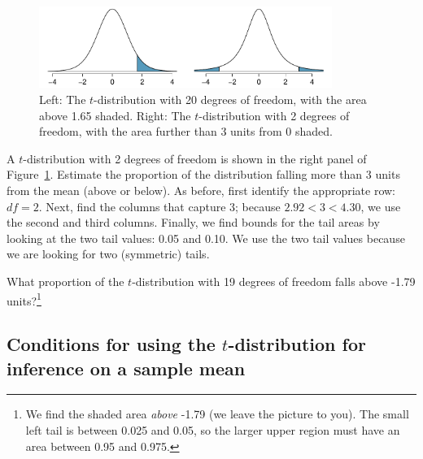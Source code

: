 \begin{figure}
\centering
\includegraphics[width=0.85\textwidth]{ch_inference_foundations_oi_biostat/figures/tDistDF20RightTail1Point65/tDistDF20RightTail1Point65}
\caption{Left: The $t$-distribution with 20 degrees of freedom, with the area above 1.65 shaded. Right: The $t$-distribution with 2 degrees of freedom, with the area further than 3 units from 0 shaded.}
\label{tDistDF20RightTail1Point65}
\end{figure}

\begin{example}{A $t$-distribution with 2 degrees of freedom is shown in the right panel of Figure~\ref{tDistDF20RightTail1Point65}. Estimate the proportion of the distribution falling more than 3 units from the mean (above or below).}
As before, first identify the appropriate row: $df=2$. Next, find the columns that capture 3; because $2.92 < 3 < 4.30$, we use the second and third columns. Finally, we find bounds for the tail areas by looking at the two tail values: 0.05 and 0.10. We use the two tail values because we are looking for two (symmetric) tails.
\end{example}

\begin{exercise}
What proportion of the $t$-distribution with 19 degrees of freedom falls above -1.79 units?\footnote{We find the shaded area \emph{above} -1.79 (we leave the picture to you). The small left tail is between 0.025 and 0.05, so the larger upper region must have an area between 0.95 and 0.975.}


\end{exercise}



\subsection{Conditions for using the $t$-distribution for inference on a sample mean}
\label{tDistSolutionToSEProblem}


